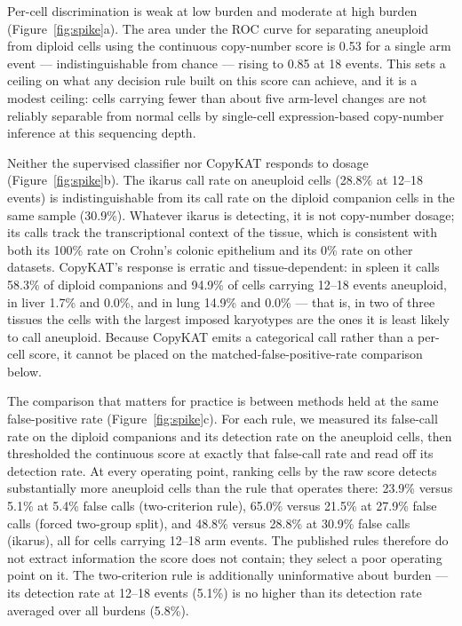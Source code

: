 \documentclass[11pt]{article}
\begin{document}
Per-cell discrimination is weak at low burden and moderate at high burden
(Figure~\ref{fig:spike}a). The area under the ROC curve for separating
aneuploid from diploid cells using the continuous copy-number score is 0.53
for a single arm event --- indistinguishable from chance --- rising to 0.85
at 18 events. This sets a ceiling on what any decision rule built on this
score can achieve, and it is a modest ceiling: cells carrying fewer than
about five arm-level changes are not reliably separable from normal cells by
single-cell expression-based copy-number inference at this sequencing depth.

Neither the supervised classifier nor CopyKAT responds to dosage
(Figure~\ref{fig:spike}b). The ikarus call rate on aneuploid cells (28.8\% at
12--18 events) is indistinguishable from its call rate on the diploid
companion cells in the same sample (30.9\%). Whatever ikarus is detecting, it
is not copy-number dosage; its calls track the transcriptional context of the
tissue, which is consistent with both its 100\% rate on Crohn's colonic
epithelium and its 0\% rate on other datasets. CopyKAT's response is erratic
and tissue-dependent: in spleen it calls 58.3\% of diploid companions and
94.9\% of cells carrying 12--18 events aneuploid, in liver 1.7\% and 0.0\%,
and in lung 14.9\% and 0.0\% --- that is, in two of three tissues the cells
with the largest imposed karyotypes are the ones it is least likely to call
aneuploid. Because CopyKAT emits a categorical call rather than a per-cell
score, it cannot be placed on the matched-false-positive-rate comparison
below.

The comparison that matters for practice is between methods held at the same
false-positive rate (Figure~\ref{fig:spike}c). For each rule, we measured its
false-call rate on the diploid companions and its detection rate on the
aneuploid cells, then thresholded the continuous score at exactly that
false-call rate and read off its detection rate. At every operating point,
ranking cells by the raw score detects substantially more aneuploid cells
than the rule that operates there: 23.9\% versus 5.1\% at 5.4\% false calls
(two-criterion rule), 65.0\% versus 21.5\% at 27.9\% false calls (forced
two-group split), and 48.8\% versus 28.8\% at 30.9\% false calls (ikarus),
all for cells carrying 12--18 arm events. The published rules therefore do
not extract information the score does not contain; they select a poor
operating point on it. The two-criterion rule is additionally uninformative
about burden --- its detection rate at 12--18 events (5.1\%) is no higher
than its detection rate averaged over all burdens (5.8\%).
\end{document}
